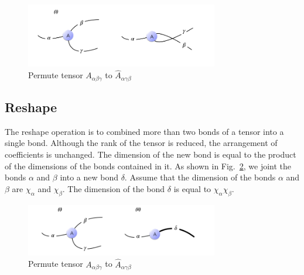 \begin{figure}[H]
	\centering
	\includegraphics[width=0.75\textwidth]{figures/fig224.png}
	\caption[The permutation of a tensor.]{ Permute tensor $A_{\alpha \beta \gamma}$ to $\hat{A}_{\alpha \gamma \beta}$ }
	\label{fig224}
\end{figure}

\subsection{Reshape}
\label{reshape}
The reshape operation is to combined more than two bonds of a tensor into a single bond. Although the rank of the tensor is reduced, the arrangement of coefficients is unchanged. The dimension of the new bond is equal to the product of the dimensions of the bonds contained in it. As shown in Fig.~\ref{figreshape}, we joint the bonds $\alpha$ and $\beta$ into a new bond $\delta$. Assume that the dimension of the bonds $\alpha$ and $\beta$ are $\chi_{\alpha}$ and $\chi_{\beta}$. The dimension of the bond $\delta$ is equal to $\chi_{\alpha}\chi_{\beta}$.

\begin{figure}[H]
	\centering
	\includegraphics[width=0.75\textwidth]{figures/figreshape.png}
	\caption[The permutation of a tensor.]{ Permute tensor $A_{\alpha \beta \gamma}$ to $\hat{A}_{\alpha \gamma \beta}$ }
	\label{figreshape}
\end{figure}


%

